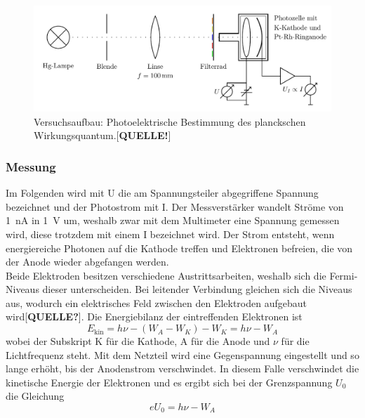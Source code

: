 \begin{figure}[htb]
	\centering
	\includegraphics[width=0.8\linewidth]{../figs/photozelle_optikbank}
	\caption{Versuchsaufbau: Photoelektrische Bestimmung des planckschen Wirkungsquantum.[\textbf{QUELLE!}]}
	\label{fig:photozelle_optikbank}
\end{figure}

\subsubsection{Messung}
Im Folgenden wird mit U die am Spannungsteiler abgegriffene Spannung bezeichnet und der Photostrom 
mit I. Der Messverstärker wandelt Ströme von \SI{1}{\nano\ampere} in \SI{1}{\volt} um, 
weshalb zwar mit dem Multimeter eine Spannung gemessen wird, diese trotzdem mit einem I bezeichnet
wird. Der Strom entsteht, wenn energiereiche Photonen auf die Kathode treffen und 
Elektronen befreien, die von der Anode wieder abgefangen werden.\\ 
Beide Elektroden besitzen verschiedene Austrittsarbeiten, weshalb sich die Fermi-Niveaus
dieser unterscheiden. Bei leitender Verbindung gleichen sich die Niveaus aus, wodurch 
ein elektrisches Feld zwischen den Elektroden aufgebaut wird[\textbf{QUELLE?}]. Die Energiebilanz der eintreffenden 
Elektronen ist 
\begin{equation}
	E_\mathrm{kin} = h\nu - (W_A - W_K) - W_K = h\nu - W_A\nonumber
\end{equation}
wobei der Subskript K für die Kathode, A für die Anode und $\nu$ für die Lichtfrequenz steht.
Mit dem Netzteil wird eine Gegenspannung eingestellt und so lange erhöht, bis 
der Anodenstrom verschwindet. In diesem Falle verschwindet die kinetische Energie der Elektronen 
und es ergibt sich bei der Grenzspannung $U_0$ die Gleichung 
\begin{equation}
	eU_0 = h\nu - W_A
	\label{eq:gegenfeldmethode}
\end{equation}


